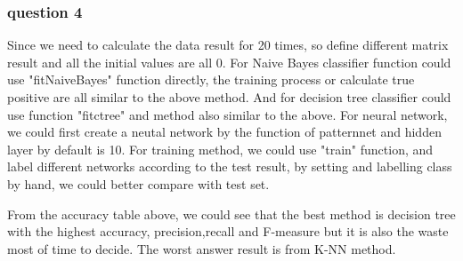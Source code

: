 \documentclass[]{article}
\begin{document}
\subsubsection{question 4}
Since we need to calculate the data result for 20 times, so define different matrix result and all the initial values are all 0. For Naive Bayes classifier function could use "fitNaiveBayes" function directly, the training process or calculate true positive are all similar to the above method. And for decision tree classifier could use function "fitctree" and method also similar to the above. For neural network, we could first create a neutal network by the function of patternnet and hidden layer by default is 10. For training method, we could use "train" function, and label different networks according to the test result, by setting and labelling class by hand, we could better compare with test set.

From the accuracy table above, we could see that the best method is decision tree with the highest accuracy, precision,recall and F-measure but it is also the waste most of time to decide. The worst answer result is from K-NN method.
\end{document}
